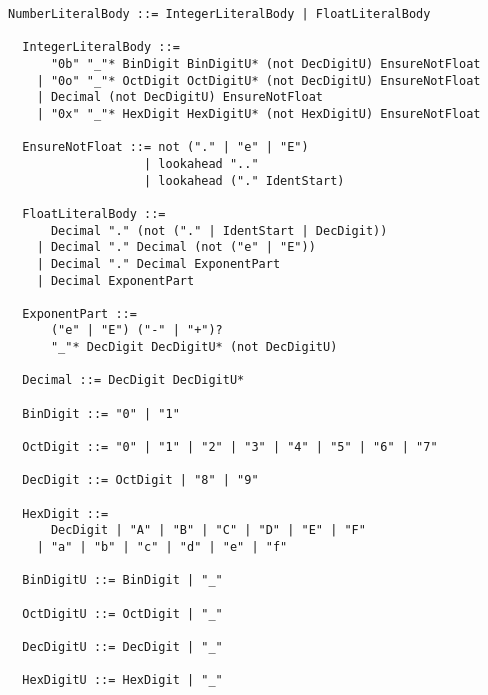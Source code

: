 \documentclass[dvipdfmx,uplatex,papersize,a4paper,10pt]{jsbook}
\theoremstyle{definition}
\begin{document}
\begin{lstlisting}[gobble=2]
  NumberLiteralBody ::= IntegerLiteralBody | FloatLiteralBody

  IntegerLiteralBody ::=
      "0b" "_"* BinDigit BinDigitU* (not DecDigitU) EnsureNotFloat
    | "0o" "_"* OctDigit OctDigitU* (not DecDigitU) EnsureNotFloat
    | Decimal (not DecDigitU) EnsureNotFloat
    | "0x" "_"* HexDigit HexDigitU* (not HexDigitU) EnsureNotFloat

  EnsureNotFloat ::= not ("." | "e" | "E")
                   | lookahead ".."
                   | lookahead ("." IdentStart)

  FloatLiteralBody ::=
      Decimal "." (not ("." | IdentStart | DecDigit))
    | Decimal "." Decimal (not ("e" | "E"))
    | Decimal "." Decimal ExponentPart
    | Decimal ExponentPart

  ExponentPart ::=
      ("e" | "E") ("-" | "+")?
      "_"* DecDigit DecDigitU* (not DecDigitU)

  Decimal ::= DecDigit DecDigitU*

  BinDigit ::= "0" | "1"

  OctDigit ::= "0" | "1" | "2" | "3" | "4" | "5" | "6" | "7"

  DecDigit ::= OctDigit | "8" | "9"

  HexDigit ::=
      DecDigit | "A" | "B" | "C" | "D" | "E" | "F"
    | "a" | "b" | "c" | "d" | "e" | "f"

  BinDigitU ::= BinDigit | "_"

  OctDigitU ::= OctDigit | "_"

  DecDigitU ::= DecDigit | "_"

  HexDigitU ::= HexDigit | "_"
\end{lstlisting}
\end{document}
